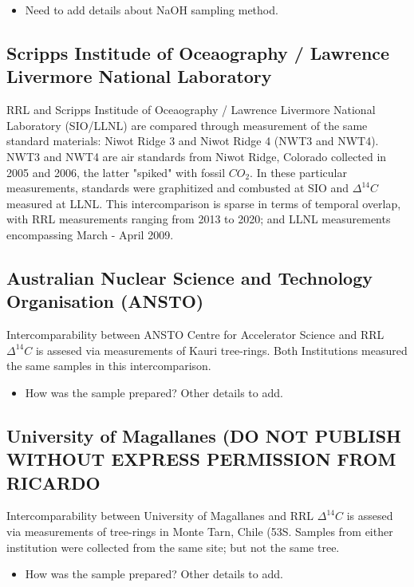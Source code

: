 \begin{itemize}
	\item Need to add details about NaOH sampling method. 
\end{itemize}


\subsection{Scripps Institude of Oceaography / Lawrence Livermore National Laboratory}

RRL and Scripps Institude of Oceaography / Lawrence Livermore National Laboratory (SIO/LLNL) are compared through measurement of the same standard materials: Niwot Ridge 3 and Niwot Ridge 4 (NWT3 and NWT4). NWT3 and NWT4 are air standards from Niwot Ridge, Colorado collected in 2005 and 2006, the latter "spiked" with fossil ${CO_{2}}$. In these particular measurements, standards were graphitized and combusted at SIO and ${\Delta^{14}C}$ measured at LLNL. This intercomparison is sparse in terms of temporal overlap, with RRL measurements ranging from 2013 to 2020; and LLNL measurements encompassing March - April 2009. 
\subsection{Australian Nuclear Science and Technology Organisation (ANSTO)}

Intercomparability between ANSTO Centre for Accelerator Science and RRL ${\Delta^{14}C}$ is assesed via measurements of Kauri tree-rings. Both Institutions measured the same samples in this intercomparison.   
\begin{itemize}
	\item How was the sample prepared? Other details to add. 
\end{itemize}

\subsection{University of Magallanes (DO NOT PUBLISH WITHOUT EXPRESS PERMISSION FROM RICARDO}
  
Intercomparability between University of Magallanes and RRL ${\Delta^{14}C}$ is assesed via measurements of tree-rings in Monte Tarn, Chile (53S. Samples from either institution were collected from the same site; but not the same tree. 
\begin{itemize}
	\item How was the sample prepared? Other details to add. 
\end{itemize}


